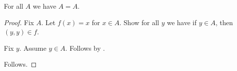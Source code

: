 \begin{proposition}\label{phase5_local_function}
    For all $A$ we have $A = A$.
\end{proposition}
\begin{proof}
    Fix $A$.
    Let $f(x) = x$ for $x\in A$.
    Show for all $y$ we have if $y\in A$, then $(y,y)\in f$.
    \begin{subproof}
        Fix $y$.
        Assume $y\in A$.
        Follows by \auto.
    \end{subproof}
    Follows.
\end{proof}
